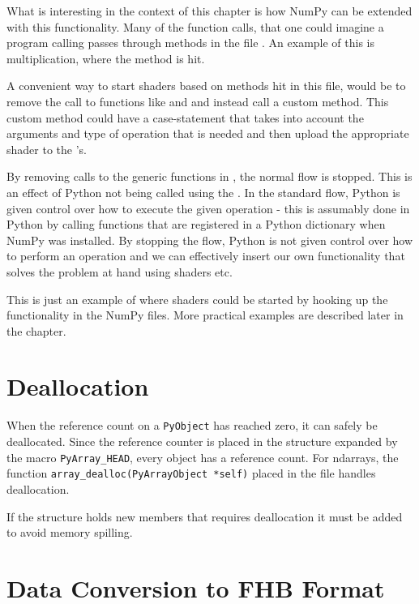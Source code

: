 What is interesting in the context of this chapter is how NumPy can be
extended with this functionality. Many of the function calls, that one
could imagine a program
calling passes through methods in the file .
An example of this is multiplication, where the
method \linebreak[5]  is hit.

A convenient way to start shaders based on methods hit in this file, would be to remove
the call to functions like  and  and
instead call a custom method. This custom method could have a case-statement that takes into
account the arguments and type of operation that is needed and then upload the appropriate
shader to the \SPE{}'s.

By removing calls to the generic functions in ,
the normal flow is stopped. This is an effect of Python not being
called using the . In the standard flow,
Python is given control over how to execute the given operation - this
is assumably done in Python by calling functions that are registered
in a Python dictionary when NumPy was installed. By stopping the flow,
Python is not given control over how to perform an operation and we
can effectively insert our own functionality that solves the problem
at hand using shaders etc.

This is just an example of where shaders could be started by hooking up the functionality in
the NumPy files. More practical examples are described later in the chapter.

\section{Deallocation}

When the reference count on a \texttt{PyObject} has reached zero, it
can safely be deallocated. Since the reference counter is placed in
the structure expanded by the macro \texttt{PyArray\_HEAD}, every
object has a reference count. For ndarrays, the
function \texttt{array\_dealloc(PyArrayObject *self)} placed in the
file  handles deallocation.

If the  structure holds new members that
requires deallocation it must be added to avoid memory spilling.

\section{Data Conversion to FHB Format}

